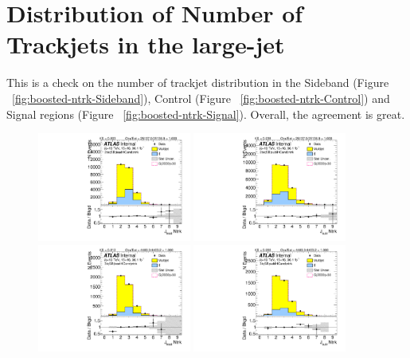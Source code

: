 \section{Distribution of Number of Trackjets in the large-\R jet}
\label{app:ntrkjet}

This is a check on the number of trackjet distribution in the Sideband (Figure ~\ref{fig:boosted-ntrk-Sideband}), Control (Figure ~\ref{fig:boosted-ntrk-Control}) and Signal regions (Figure ~\ref{fig:boosted-ntrk-Signal}). Overall, the agreement is great.


\begin{figure}[htbp!]
\begin{center}
\includegraphics[width=0.45\textwidth,angle=-90]{figures/boosted/Sideband/b77_TwoTag_split_Sideband_leadHCand_ntrk.pdf}
\includegraphics[width=0.45\textwidth,angle=-90]{figures/boosted/Sideband/b77_TwoTag_split_Sideband_sublHCand_ntrk.pdf}\\
\includegraphics[width=0.45\textwidth,angle=-90]{figures/boosted/Sideband/b77_ThreeTag_Sideband_leadHCand_ntrk.pdf}
\includegraphics[width=0.45\textwidth,angle=-90]{figures/boosted/Sideband/b77_ThreeTag_Sideband_sublHCand_ntrk.pdf}\\

\end{center}
\end{figure}
